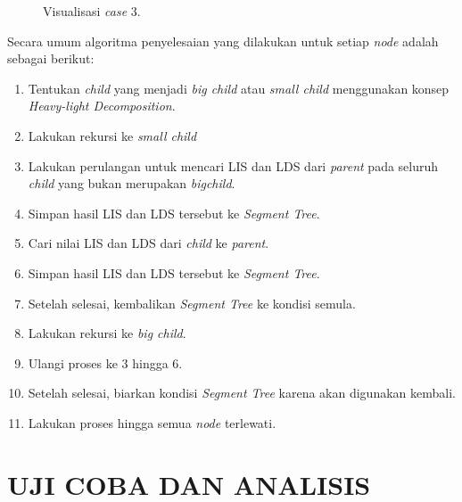 \documentclass[a4paper]{IEEEtran}
\begin{document}
\begin{figure}[H]
	\centering
	\caption{Visualisasi \textit{case} 3.\label{fig:case3}}
\end{figure}
Secara umum algoritma penyelesaian yang dilakukan untuk setiap \textit{node} adalah sebagai berikut:
\begin{enumerate}
	\item Tentukan \textit{child} yang menjadi \textit{big child} atau \textit{small child} menggunakan konsep \textit{Heavy-light Decomposition}.
	\item Lakukan rekursi ke \textit{small child}
	\item Lakukan perulangan untuk mencari LIS dan LDS dari \textit{parent} pada seluruh \textit{child} yang bukan merupakan \textit{bigchild}.
	\item Simpan hasil LIS dan LDS tersebut ke \textit{Segment Tree}.
	\item Cari nilai LIS dan LDS dari \textit{child} ke \textit{parent}.
	\item Simpan hasil LIS dan LDS tersebut ke \textit{Segment Tree}.
	\item Setelah selesai, kembalikan \textit{Segment Tree} ke kondisi semula.
	\item Lakukan rekursi ke \textit{big child}.
	\item Ulangi proses ke 3 hingga 6.
	\item Setelah selesai, biarkan kondisi \textit{Segment Tree} karena akan digunakan kembali.
	\item Lakukan proses hingga semua \textit{node} terlewati.
\end{enumerate}
\section{UJI COBA DAN ANALISIS}
\end{document}
